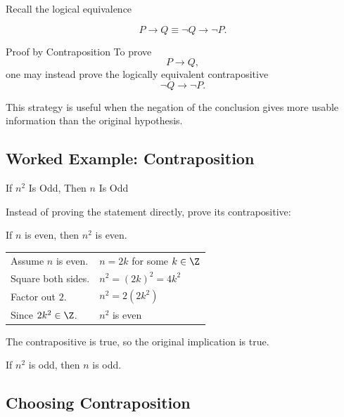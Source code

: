 Recall the logical equivalence

\[ P\to Q\equiv\neg Q\to\neg P. \]

\begin{definitionbox}{Proof by Contraposition}
To prove
\[ P\to Q, \]
one may instead prove the logically equivalent contrapositive
\[ \neg Q\to\neg P. \]
\end{definitionbox}

This strategy is useful when the negation of the conclusion gives more usable
information than the original hypothesis.

\subsection{Worked Example: Contraposition}
\label{subsec:worked-contraposition}

\begin{workedexamplebox}{If \(n^2\) Is Odd, Then \(n\) Is Odd}

Instead of proving the statement directly, prove its contrapositive:

\begin{center}
If \(n\) is even, then \(n^2\) is even.
\end{center}

\begin{tabularx}{\textwidth}{@{}>{\raggedright\arraybackslash}p{}X@{}}
Assume \(n\) is even. & \(n=2k\) for some \(k\in\Z\)\\
Square both sides. & \(n^2=(2k)^2=4k^2\)\\
Factor out \(2\). & \(n^2=2(2k^2)\)\\
Since \(2k^2\in\Z\). & \(n^2\) is even
\end{tabularx}

The contrapositive is true, so the original implication is true.

\begin{answerbox}
If \(n^2\) is odd, then \(n\) is odd.
\end{answerbox}
\end{workedexamplebox}

\subsection{Choosing Contraposition}
\label{subsec:choosing-contraposition}

